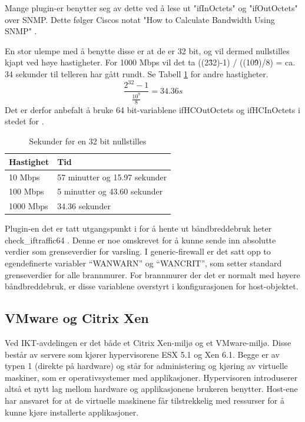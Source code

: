 Mange plugin-er benytter seg av dette ved å lese ut "ifInOctets" og "ifOutOctets" over SNMP. Dette følger Ciscos notat "How to Calculate Bandwidth Using SNMP" \cite{ciscobandwidth}. 

En stor ulempe med å benytte disse er at de er 32 bit, og vil dermed nullstilles kjapt ved høye hastigheter. For 1000 Mbps vil det ta ((2\^32)-1) / ((10\^9)/8) = ca. 34 sekunder til telleren har gått rundt. Se Tabell \ref{kalkulering_teller} for andre hastigheter.
\begin{equation}
\frac{2^{32}-1}{\frac{10^9}{8}}=34.36 s
\end{equation}
Det er derfor anbefalt å bruke 64 bit-variablene ifHCOutOctets og ifHCInOctets i stedet for \cite{ciscosnmpcounters}.
\begin{table}
\begin{center}
\begin{tabular}{ | l | p{7cm} |} \hline
    \textbf{Hastighet} & \textbf{Tid} \\ \hline
    10 Mbps & 57 minutter og 15.97 sekunder \\ \hline
    100 Mbps & 5 minutter og 43.60 sekunder \\ \hline
    1000 Mbps & 34.36 sekunder \\ \hline
\end{tabular}
\caption{Sekunder før en 32 bit nullstilles }
\label{kalkulering_teller}
\end{center}
\end{table}
Plugin-en det er tatt utgangspunkt i for å hente ut båndbreddebruk heter check\_iftraffic64 \cite{checkciscoif}. Denne er noe omskrevet for å kunne sende inn absolutte verdier som grenseverdier for varsling. I generic-firewall er det satt opp to egendefinerte variabler ``WANWARN'' og ``WANCRIT'', som setter standard grenseverdier for alle brannmurer. For brannmurer der det er normalt med høyere båndbreddebruk, er disse variablene overstyrt i konfigurasjonen for host-objektet.

\subsection{VMware og Citrix Xen}
Ved IKT-avdelingen er det både et Citrix Xen-miljø og et VMware-miljø. Disse består av servere som kjører hypervisorene ESX 5.1 og Xen 6.1. Begge er av typen 1 (direkte på hardware) og står for administering og kjøring av virtuelle maskiner, som er operativsystemer med applikasjoner. Hypervisoren introduserer altså et nytt lag mellom hardware og applikasjonene brukeren benytter. Host-ene har ansvaret for at de virtuelle maskinene får tilstrekkelig med ressurser for å kunne kjøre installerte applikasjoner. 

